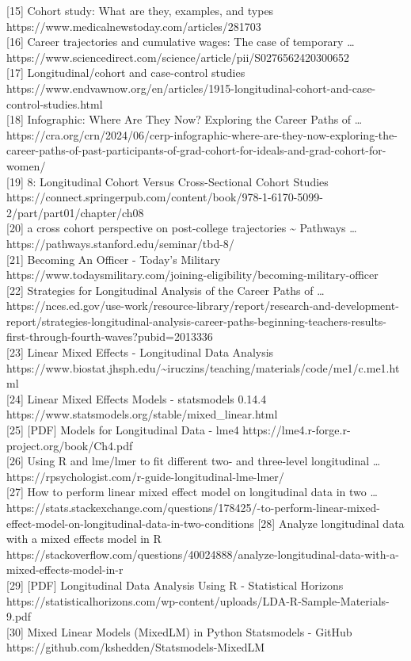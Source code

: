 \documentclass[./main.tex]{subfiles}
\begin{document}
{[}15{]} Cohort study: What are they, examples, and types
https://www.medicalnewstoday.com/articles/281703\\
{[}16{]} Career trajectories and cumulative wages: The case of temporary
\ldots{}
https://www.sciencedirect.com/science/article/pii/S0276562420300652\\
{[}17{]} Longitudinal/cohort and case-control studies
https://www.endvawnow.org/en/articles/1915-longitudinal-cohort-and-case-control-studies.html\\
{[}18{]} Infographic: Where Are They Now? Exploring the Career Paths of
\ldots{}
https://cra.org/crn/2024/06/cerp-infographic-where-are-they-now-exploring-the-career-paths-of-past-participants-of-grad-cohort-for-ideals-and-grad-cohort-for-women/\\
{[}19{]} 8: Longitudinal Cohort Versus Cross-Sectional Cohort Studies
https://connect.springerpub.com/content/book/978-1-6170-5099-2/part/part01/chapter/ch08\\
{[}20{]} a cross cohort perspective on post-college trajectories
\textasciitilde{} Pathways \ldots{}
https://pathways.stanford.edu/seminar/tbd-8/\\
{[}21{]} Becoming An Officer - Today's Military
https://www.todaysmilitary.com/joining-eligibility/becoming-military-officer\\
{[}22{]} Strategies for Longitudinal Analysis of the Career Paths of
\ldots{}
https://nces.ed.gov/use-work/resource-library/report/research-and-development-report/strategies-longitudinal-analysis-career-paths-beginning-teachers-results-first-through-fourth-waves?pubid=2013336\\
{[}23{]} Linear Mixed Effects - Longitudinal Data Analysis
https://www.biostat.jhsph.edu/\textasciitilde iruczins/teaching/materials/code/me1/c.me1.html\\
{[}24{]} Linear Mixed Effects Models - statsmodels 0.14.4
https://www.statsmodels.org/stable/mixed\_linear.html\\
{[}25{]} {[}PDF{]} Models for Longitudinal Data - lme4
https://lme4.r-forge.r-project.org/book/Ch4.pdf\\
{[}26{]} Using R and lme/lmer to fit different two- and three-level
longitudinal \ldots{}
https://rpsychologist.com/r-guide-longitudinal-lme-lmer/\\
{[}27{]} How to perform linear mixed effect model on longitudinal data
in two \ldots{}
https://stats.stackexchange.com/questions/178425/\how-to-perform-linear-mixed-effect-model-on-longitudinal-data-in-two-conditions
{[}28{]} Analyze longitudinal data with a mixed effects model in R
https://stackoverflow.com/questions/40024888/analyze-longitudinal-data-with-a-mixed-effects-model-in-r\\
{[}29{]} {[}PDF{]} Longitudinal Data Analysis Using R - Statistical
Horizons
https://statisticalhorizons.com/wp-content/uploads/LDA-R-Sample-Materials-9.pdf\\
{[}30{]} Mixed Linear Models (MixedLM) in Python Statsmodels - GitHub
https://github.com/kshedden/Statsmodels-MixedLM\\
\end{document}
